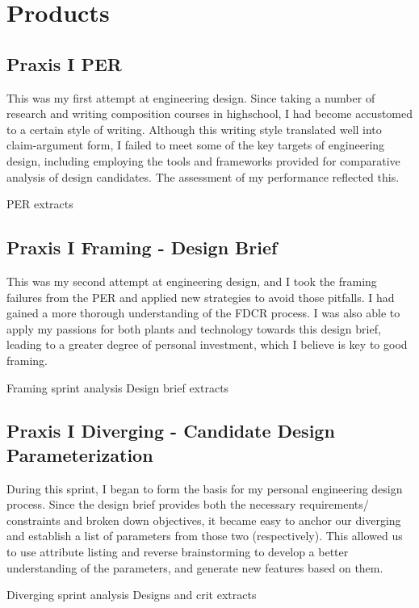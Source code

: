 \documentclass{report}
\begin{document}
\section{Products}
\subsection{Praxis I PER}
This was my first attempt at engineering design. Since taking a number of 
research and writing composition courses in highschool, I had become accustomed 
to a certain style of writing. Although this writing style translated well 
into claim-argument form, I failed to meet some of the key targets of engineering 
design, including employing the tools and frameworks provided for comparative 
analysis of design candidates. The assessment of my performance reflected this.



PER extracts
\subsection{Praxis I Framing - Design Brief}
This was my second attempt at engineering design, and I took the framing 
failures from the PER and applied new strategies to avoid those pitfalls. 
I had gained a more thorough understanding of the FDCR process. I was also 
able to apply my passions for both plants and technology towards this design 
brief, leading to a greater degree of personal investment, which I believe 
is key to good framing.

Framing sprint analysis
Design brief extracts
\subsection{Praxis I Diverging - Candidate Design Parameterization}
During this sprint, I began to form the basis for my personal engineering 
design process. Since the design brief provides both the necessary requirements/
constraints and broken down objectives, it became easy to anchor our diverging 
and establish a list of parameters from those two (respectively). This allowed 
us to use attribute listing and reverse brainstorming to develop a better 
understanding of the parameters, and generate new features based on them.

Diverging sprint analysis
Designs and crit extracts
\end{document}
